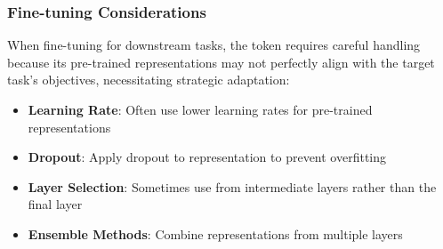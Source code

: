 \subsubsection{Fine-tuning Considerations}
When fine-tuning for downstream tasks, the \cls{} token requires careful handling because its pre-trained representations may not perfectly align with the target task's objectives, necessitating strategic adaptation:

\begin{itemize}
\item \textbf{Learning Rate}: Often use lower learning rates for pre-trained \cls{} representations
\item \textbf{Dropout}: Apply dropout to \cls{} representation to prevent overfitting
\item \textbf{Layer Selection}: Sometimes use \cls{} from intermediate layers rather than the final layer
\item \textbf{Ensemble Methods}: Combine \cls{} representations from multiple layers
\end{itemize}


